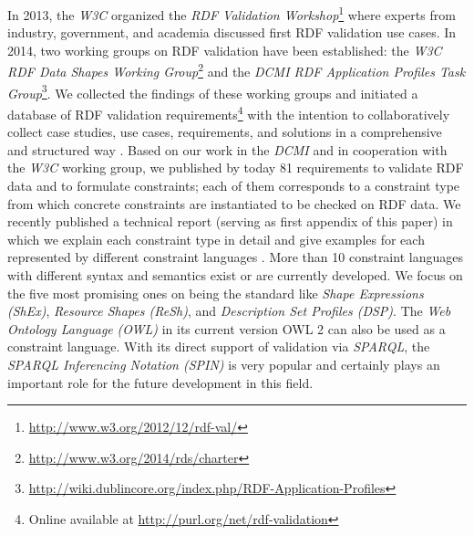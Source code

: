\documentclass[a4paper,fontsize=11pt]{scrartcl}
\begin{document}
In 2013, the \emph{W3C} organized the \emph{RDF Validation Workshop}\footnote{\url{http://www.w3.org/2012/12/rdf-val/}}
where experts from industry, government, and academia discussed first RDF validation use cases. 
In 2014, two working groups on RDF validation have been established: 
the \emph{W3C RDF Data Shapes Working Group}\footnote{\url{http://www.w3.org/2014/rds/charter}} and the \emph{DCMI RDF Application Profiles Task Group}\footnote{\url{http://wiki.dublincore.org/index.php/RDF-Application-Profiles}}. 
We collected the findings of these working groups and initiated a database of RDF validation requirements\footnote{Online available at \url{http://purl.org/net/rdf-validation}}
with the intention to collaboratively collect case studies, use cases, requirements, and solutions in a comprehensive and structured way \cite{BoschEckert2014}. 
Based on our work in the \emph{DCMI} and in cooperation with the \emph{W3C} working group,
we published by today 81 requirements to validate RDF data and to formulate constraints; 
each of them corresponds to a constraint type from which concrete constraints are instantiated to be checked on RDF data. 
We recently published a technical report (serving as first appendix of this paper) in which we explain each constraint type in detail and give examples for each represented by different constraint languages \cite{BoschNolleAcarEckert2015}.
More than 10 constraint languages with different syntax and semantics exist or are currently developed. 
We focus on the five most promising ones on being the standard like
\emph{Shape Expressions (ShEx)}, \emph{Resource Shapes (ReSh)}, and \emph{Description Set Profiles (DSP)}. 
The \emph{Web Ontology Language} \emph{(OWL)} in its current version OWL 2 can also be used as a constraint language.
With its direct support of validation via \emph{SPARQL}, the \emph{SPARQL Inferencing Notation (SPIN)} is very popular and certainly plays an important role for the future development in this field. 
\end{document}
